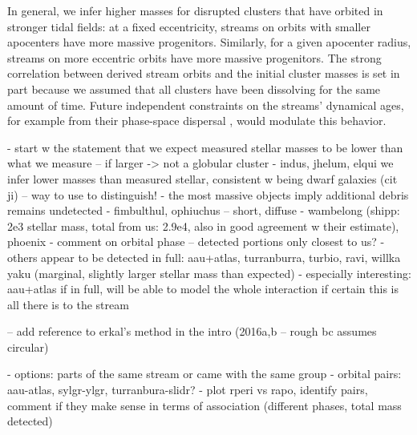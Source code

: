 \documentclass[twocolumn]{aastex63}
\newcommand{\msun}{\ensuremath{\textrm{M}_\odot}}
\newcommand{\kpc}{\ensuremath{\textrm{kpc}}}
\begin{document}
In general, we infer higher masses for disrupted clusters that have orbited in stronger tidal fields: at a fixed eccentricity, streams on orbits with smaller apocenters have more massive progenitors.
Similarly, for a given apocenter radius, streams on more eccentric orbits have more massive progenitors.
The strong correlation between derived stream orbits and the initial cluster masses is set in part because we assumed that all clusters have been dissolving for the same amount of time.
Future independent constraints on the streams' dynamical ages, for example from their phase-space dispersal \citep{buckley:2019},  would modulate this behavior.

- start w the statement that we expect measured stellar masses to be lower than what we measure -- if larger -> not a globular cluster
- indus, jhelum, elqui we infer lower masses than measured stellar, consistent w being dwarf galaxies (cit ji) -- way to use to distinguish!
- the most massive objects imply additional debris remains undetected
- fimbulthul, ophiuchus -- short, diffuse
- wambelong (shipp: 2e3 stellar mass, total from us: 2.9e4, also in good agreement w their estimate), phoenix
- comment on orbital phase -- detected portions only closest to us?
- others appear to be detected in full: aau+atlas, turranburra, turbio, ravi, willka yaku (marginal, slightly larger stellar mass than expected)
- especially interesting: aau+atlas if in full, will be able to model the whole interaction if certain this is all there is to the stream

-- add reference to erkal's method in the intro (2016a,b -- rough bc assumes circular)

% 


- options: parts of the same stream or came with the same group
- orbital pairs: aau-atlas, sylgr-ylgr, turranbura-slidr?
- plot rperi vs rapo, identify pairs, comment if they make sense in terms of association (different phases, total mass detected)
\end{document}
